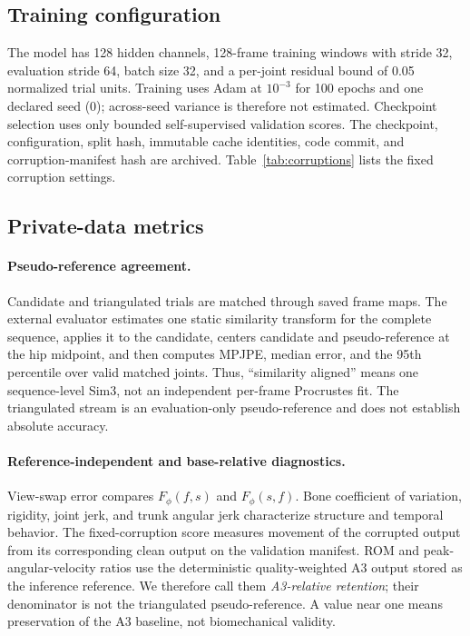 

\subsection{Training configuration}

The model has 128 hidden channels, 128-frame training windows with stride 32,
evaluation stride 64, batch size 32, and a per-joint residual bound of 0.05
normalized trial units. Training uses Adam at $10^{-3}$ for 100 epochs and one
declared seed (0); across-seed variance is therefore not estimated. Checkpoint
selection uses only bounded self-supervised validation scores. The checkpoint,
configuration, split hash, immutable cache identities, code commit, and
corruption-manifest hash are archived. Table~\ref{tab:corruptions} lists the
fixed corruption settings.



\subsection{Private-data metrics}

\paragraph{Pseudo-reference agreement.}
Candidate and triangulated trials are matched through saved frame maps. The
external evaluator estimates one static similarity transform for the complete
sequence, applies it to the candidate, centers candidate and pseudo-reference
at the hip midpoint, and then computes MPJPE, median error, and the 95th
percentile over valid matched joints. Thus, ``similarity aligned'' means one sequence-level Sim3,
not an independent per-frame Procrustes fit. The
triangulated stream is an evaluation-only pseudo-reference and does not
establish absolute accuracy.

\paragraph{Reference-independent and base-relative diagnostics.}
View-swap error compares $F_{\phi}(f,s)$ and $F_{\phi}(s,f)$. Bone coefficient
of variation, rigidity, joint jerk, and trunk angular jerk characterize
structure and temporal behavior. The fixed-corruption score measures movement
of the corrupted output from its corresponding clean output on the validation
manifest. ROM and peak-angular-velocity ratios use the deterministic
quality-weighted A3 output stored as the inference reference. We therefore call
them \emph{A3-relative retention}; their denominator is not the triangulated
pseudo-reference. A value near one means preservation of the A3 baseline, not
biomechanical validity.

